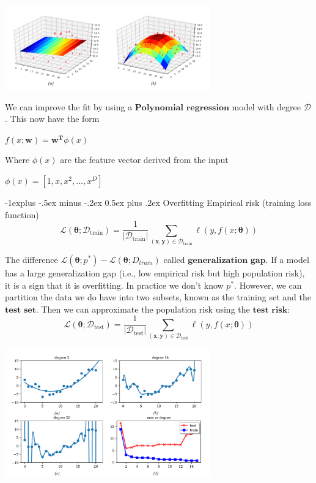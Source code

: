 \documentclass[10pt,landscape]{article}
\makeatletter
\renewcommand{\subsection}{\@startsection{subsection}{2}{0mm}%
                                {-1explus -.5ex minus -.2ex}%
                                {0.5ex plus .2ex}%
                                {\normalfont\normalsize\bfseries}}
\makeatother
\begin{document}
\begin{multicols*}{3}
\begin{minipage}{\linewidth}
            \includegraphics[width=3.5in]{figures/polynomial_regression.PNG}
    \end{minipage}
    We can improve the fit by using a $\textbf{Polynomial regression}$ model with degree $\mathcal{D}$. This now have the form 
    \begin{center}
        $f(x;\mathbf{w})=\mathbf{w^T}\phi(x)$
    \end{center}
    Where $\phi(x)$ are the feature vector derived from the input
    \begin{center}
        $\phi(x)=[1,x,x^2,...,x^D]$
    \end{center}

\subsection{Overfitting}
    Empirical risk (training loss function)
    \[
    \mathcal{L}(\boldsymbol{\theta}; \mathcal{D}_{\text{train}}) = 
    \frac{1}{|\mathcal{D}_{\text{train}}|} 
    \sum_{(\mathbf{x,y}) \in \mathcal{D}_{\text{train}}} 
    \ell(y, f(x; \boldsymbol{\theta}))
    \]

    The difference $\mathcal{L}(\boldsymbol{\theta};p^*)-\mathcal{L}(\boldsymbol{\theta};D_{train})$ called $\textbf{generalization gap}$.
    If a model has a large generalization gap (i.e., low empirical risk but high population risk), it is a sign that it is overfitting. In practice we don't know $p^*$. However, we can partition the data we do have into two subsets, known as the training set and the $\textbf{test set}$. Then we can approximate the population risk using the $\textbf{test risk}$:
    \[
    \mathcal{L}(\boldsymbol{\theta}; \mathcal{D}_{\text{test}}) = 
    \frac{1}{|\mathcal{D}_{\text{test}}|} 
    \sum_{(\mathbf{x,y}) \in \mathcal{D}_{\text{test}}} 
    \ell(y, f(x; \boldsymbol{\theta}))
    \]

    \begin{minipage}{\linewidth}
            \centering
            \includegraphics[width=3.5in]{figures/overfitting.PNG}
    \end{minipage}
    

\end{multicols*}
\end{document}
